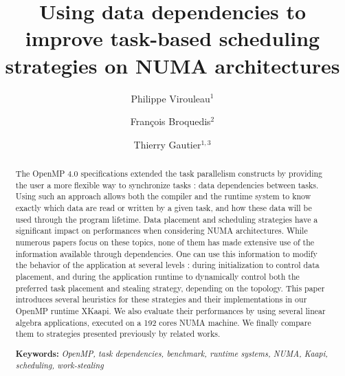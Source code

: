 \documentclass{Styles/llncs}
\begin{document}
\title{Using data dependencies to improve task-based scheduling strategies on NUMA architectures}
\author{
  Philippe Virouleau$^1$ \and François Broquedis$^2$ \and Thierry Gautier$^{1,3}$
 \vspace*{-1ex}}
\date{}
\maketitle

\begin{abstract}
  \vspace*{-5ex} The OpenMP 4.0 specifications extended the task parallelism
  constructs by providing the user a more flexible way to synchronize tasks :
  data dependencies between tasks.
  Using such an approach allows both the compiler and the runtime system
  to know exactly which data are read or written by a given task, and how these
  data will be used through the program lifetime.  Data placement and scheduling
  strategies have a significant impact on performances when considering
  NUMA architectures.  While numerous papers focus on these topics, none of them
  has made extensive use of the information available through dependencies.
  One can use this information to modify the behavior of the application at
  several levels : during initialization to control data placement,
  and during the application runtime to dynamically control both the preferred
  task placement and stealing strategy, depending on the topology.
  This paper introduces several heuristics for these strategies and their
  implementations in our OpenMP runtime XKaapi.
  We also evaluate their performances by using several linear algebra
  applications, executed on a 192 cores NUMA machine. We finally
  compare them to strategies presented previously by related works.

\smallskip
  \noindent\textbf{Keywords:}
  \emph{
    OpenMP, task dependencies, benchmark, runtime systems, NUMA, Kaapi, scheduling, work-stealing
  }
\end{abstract}
\end{document}
